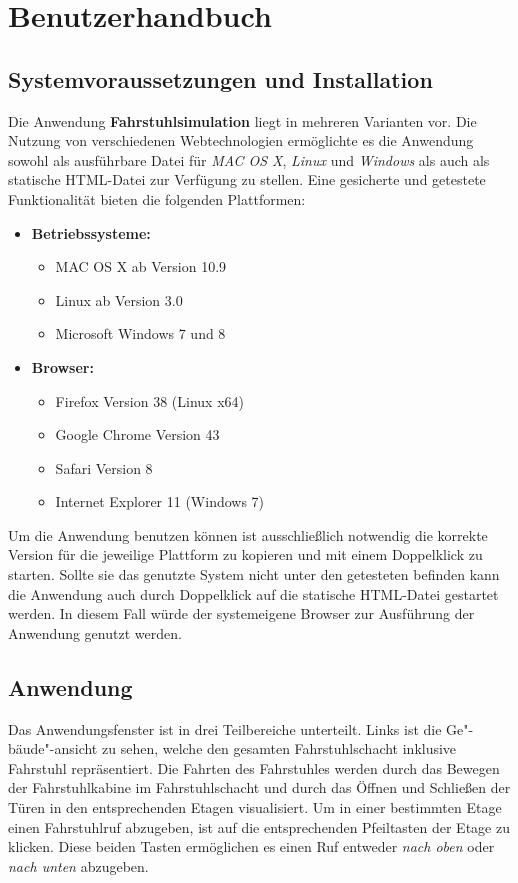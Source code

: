 \part{Benutzerhandbuch}
\chapter{Systemvoraussetzungen und Installation}
Die Anwendung \textbf{Fahrstuhlsimulation} liegt in mehreren Varianten vor. Die Nutzung von verschiedenen Webtechnologien ermöglichte es die Anwendung sowohl als ausführbare Datei für \textit{MAC OS X}, \textit{Linux} und \textit{Windows} als auch als statische HTML-Datei zur Verfügung zu stellen. Eine gesicherte und getestete Funktionalität bieten die folgenden Plattformen:

\begin{itemize}
	\item \textbf{Betriebssysteme:}
	\begin{itemize}
		\item MAC OS X ab Version 10.9
		\item Linux ab Version 3.0
		\item Microsoft Windows 7 und 8
	\end{itemize}
	\item \textbf{Browser:}
	\begin{itemize}
		\item Firefox Version 38 (Linux x64)
		\item Google Chrome Version 43
		\item Safari Version 8
		\item Internet Explorer 11 (Windows 7)
	\end{itemize}
\end{itemize}

Um die Anwendung benutzen können ist ausschließlich notwendig die korrekte Version für die jeweilige Plattform zu kopieren und mit einem Doppelklick zu starten. Sollte sie das genutzte System nicht unter den getesteten befinden kann die Anwendung auch durch Doppelklick auf die statische HTML-Datei gestartet werden. In diesem Fall würde der systemeigene Browser zur Ausführung der Anwendung genutzt werden.

\chapter{Anwendung}
Das Anwendungsfenster ist in drei Teilbereiche unterteilt. Links ist die Ge"-bäude"-ansicht zu sehen, welche den gesamten Fahrstuhlschacht inklusive Fahrstuhl repräsentiert. Die Fahrten des Fahrstuhles werden durch das Bewegen der Fahrstuhlkabine im Fahrstuhlschacht und durch das Öffnen und Schließen der Türen in den entsprechenden Etagen visualisiert. Um in einer bestimmten Etage einen Fahrstuhlruf abzugeben, ist auf die entsprechenden Pfeiltasten der Etage zu klicken. Diese beiden Tasten ermöglichen es einen Ruf entweder \textit{nach oben} oder \textit{nach unten} abzugeben.


